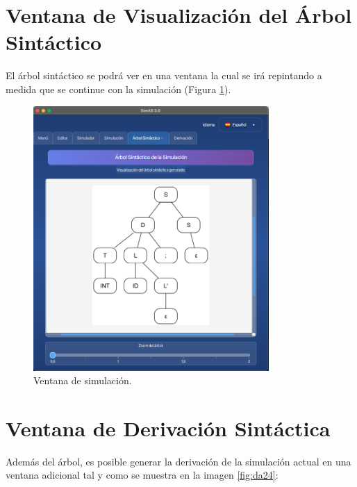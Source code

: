 \section{Ventana de Visualización del Árbol Sintáctico}

El árbol sintáctico se podrá ver en una ventana la cual se irá repintando a medida que se continue con la simulación (Figura \ref{fig:da22}).

\begin{figure}[htp]
\centering
	\includegraphics[width=0.8\textwidth]{figuras2/simulador/simulacion_arbol.png}
	\caption{Ventana de simulación.}
	\label{fig:da22}
\end{figure}

 \section{Ventana de Derivación Sintáctica}

Además del árbol, es posible generar la derivación de la simulación actual en una ventana adicional tal y como se muestra en la imagen \ref{fig:da24}:

